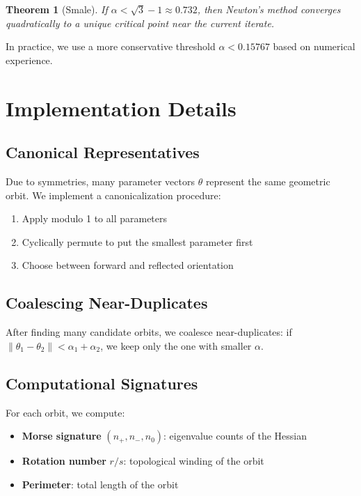 \documentclass[11pt]{amsart}
\theoremstyle{plain}
\newtheorem{theorem}{Theorem}
\theoremstyle{definition}
\theoremstyle{remark}
\begin{document}
\begin{theorem}[Smale\cite{smale1980mathematics}]
If $\alpha < \sqrt{3} - 1 \approx 0.732$, then Newton's method converges quadratically to a unique critical point near the current iterate.
\end{theorem}

In practice, we use a more conservative threshold $\alpha < 0.15767$ based on numerical experience.

\section{Implementation Details}

\subsection{Canonical Representatives}

Due to symmetries, many parameter vectors $\theta$ represent the same geometric orbit. We implement a canonicalization procedure:
\begin{enumerate}
\item Apply modulo 1 to all parameters
\item Cyclically permute to put the smallest parameter first
\item Choose between forward and reflected orientation
\end{enumerate}

\subsection{Coalescing Near-Duplicates}

After finding many candidate orbits, we coalesce near-duplicates: if $\|\theta_1 - \theta_2\| < \alpha_1 + \alpha_2$, we keep only the one with smaller $\alpha$.

\subsection{Computational Signatures}

For each orbit, we compute:
\begin{itemize}
\item \textbf{Morse signature} $(n_+, n_-, n_0)$: eigenvalue counts of the Hessian
\item \textbf{Rotation number} $r/s$: topological winding of the orbit
\item \textbf{Perimeter}: total length of the orbit
\end{itemize}
\end{document}
